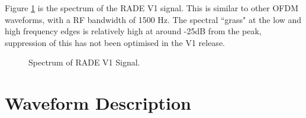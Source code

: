 \documentclass{article}
\begin{document}
Figure \ref{fig:rade_psd} is the spectrum of the RADE V1 signal. This is similar to other OFDM waveforms, with a RF bandwidth of 1500 Hz. The spectral ``grass" at the low and high frequency edges is relatively high at around -25dB from the peak, suppression of this has not been optimised in the V1 release.
  
\begin{figure}[h]
\caption{Spectrum of RADE V1 Signal.}
\label{fig:rade_psd}
\begin{center}

\end{center}
\end{figure}

\section{Waveform Description}
\end{document}
